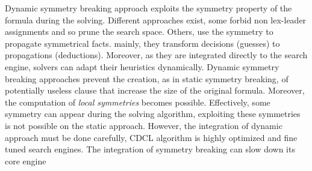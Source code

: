 Dynamic symmetry breaking approach exploits the symmetry property of the formula during the solving.
Different approaches exist, some forbid non lex-leader assignments
and so prune the search space. Others, use the symmetry to propagate symmetrical facts.
mainly, they transform decisions (guesses) to propagations (deductions). 
Moreover, as they are integrated directly to the search engine, solvers can adapt their heuristics dynamically.
Dynamic symmetry breaking  approaches prevent the creation, as in static symmetry breaking, of potentially useless clause that increase the size of the original formula.
Moreover, the computation of \textit{local symmetries} becomes possible. Effectively, some symmetry can 
appear during the solving algorithm, exploiting these symmetries is not possible on the static approach. 
However, the integration of dynamic approach must be done carefully, CDCL algorithm is highly optimized and 
fine tuned search engines. The integration of symmetry breaking can slow down its core engine




